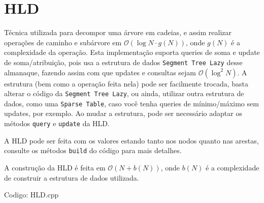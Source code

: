 \documentclass[10pt, a4paper, oneside]{book}
\begin{document}
\section{HLD}


Técnica utilizada para decompor uma árvore em cadeias, e assim realizar operações de caminho e subárvore em $\mathcal{O}(\log N \cdot g(N))$, onde $g(N)$ é a complexidade da operação. Esta implementação suporta queries de soma e update de soma/atribuição, pois usa a estrutura de dados \texttt{Segment Tree Lazy} desse almanaque, fazendo assim com que updates e consultas sejam  $\mathcal{O}(\log^2 N)$. A estrutura (bem como a operação feita nela) pode ser facilmente trocada, basta alterar o código da \texttt{Segment Tree Lazy}, ou ainda, utilizar outra estrutura de dados, como uma \texttt{Sparse Table}, caso você tenha queries de mínimo/máximo sem updates, por exemplo. Ao mudar a estrutura, pode ser necessário adaptar os métodos \texttt{query} e \texttt{update} da HLD.



A HLD pode ser feita com os valores estando tanto nos nodos quanto nas arestas, consulte os métodos \texttt{build} do código para mais detalhes.



A construção da HLD é feita em $\mathcal{O}(N + b(N))$, onde $b(N)$ é a complexidade de construir a estrutura de dados utilizada.
\hfill

Codigo: HLD.cpp
\end{document}
